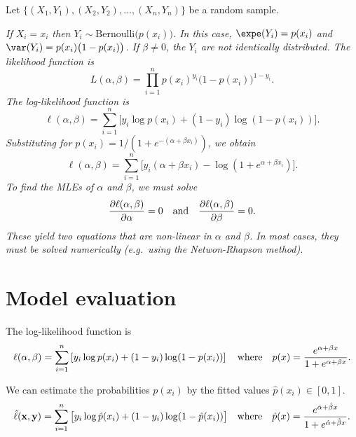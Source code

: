 Let $\{(X_1,Y_1),(X_2,Y_2),\ldots,(X_n,Y_n)\}$ be a random sample.

\bit
\it If $X_i=x_i$ then $Y_i\sim\text{Bernoulli}\big(p(x_i)\big)$.%
\it In this case, $\expe(Y_i) = p(x_i)$ and $\var(Y_i) = p(x_i)\big(1-p(x_i)\big)$.
\it If $\beta\neq 0$, the $Y_i$ are not identically distributed.
\eit
The likelihood function is
\[
L(\alpha,\beta) = \prod_{i=1}^n  p(x_i)^{y_i}\big(1-p(x_i)\big)^{1-y_i}.
\]
The log-likelihood function is
\[
\ell(\alpha,\beta) = \sum_{i=1}^n \big[y_i\log p(x_i) + (1-y_i)\log(1-p(x_i))\big].
\]
Substituting for $p(x_i) = 1/(1+e^{-(\alpha+\beta x_i)})$, we obtain
\[
\ell(\alpha,\beta) = \sum_{i=1}^n \big[y_i(\alpha+\beta x_i) - \log(1+e^{\alpha+\beta x_i})\big].
\]
To find the MLEs of $\alpha$ and $\beta$, we must solve
\[
\frac{\partial\ell(\alpha,\beta)}{\partial\alpha} = 0 \text{\quad and\quad} \frac{\partial\ell(\alpha,\beta)}{\partial\beta} = 0.
\]
\bit
\it These yield two equations that are \emph{non-linear} in $\alpha$ and $\beta$.
\it In most cases, they must be solved numerically (e.g.\ using the Netwon-Rhapson method).
\eit


\section{Model evaluation}

The log-likelihood function is
\[
\ell(\alpha,\beta) =\sum_{i=1}^n\left[y_{i}\log p(x_i) +(1-y_i)\log(1-p(x_i))\right]
\text{\quad where\quad}
p(x)=\frac{e^{\alpha+\beta x}}{1+e^{\alpha+\beta x}}.
\]
%
%

\vspace*{2ex}
We can estimate the probabilities $p(x_i)$ by the fitted values $\hat{p}(x_i)\in[0,1]$.
\[
\hat{\ell}(\mathbf{x},\mathbf{y}) = \sum_{i=1}^n \big[y_i\log \hat{p}(x_i) + (1-y_i)\log(1-\hat{p}(x_i))\big]
\text{\quad where\quad}
\hat{p}(x)=\frac{e^{\hat{\alpha}+\hat{\beta} x}}{1+e^{\hat{\alpha}+\hat{\beta} x}}.
\]

